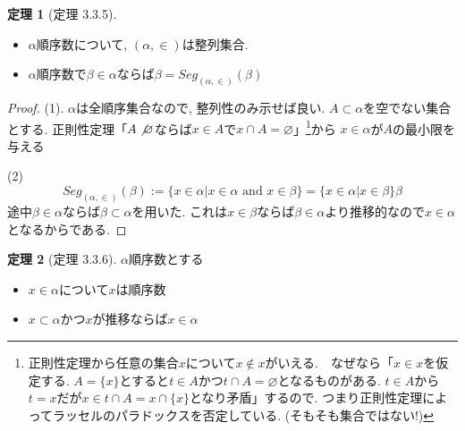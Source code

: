 \documentclass[dvipdfmx,a4paper,11pt]{report}
\theoremstyle{definition}
\newtheorem{thm}{定理}
\begin{document}
 \begin{tcolorbox}
 [colback = white, colframe = green!35!black, fonttitle = \bfseries,breakable = true]
\begin{thm}[定理 3.3.5]
\begin{itemize}
\item $\alpha$順序数について, $(\alpha, \in )$は整列集合.
\item $\alpha$順序数で$\beta \in \alpha$ならば$\beta = Seg_{(\alpha,\in )} (\beta)$
\end{itemize}
\end{thm}
\end{tcolorbox}

\begin{proof}
(1). $\alpha$は全順序集合なので, 整列性のみ示せば良い.
$A \subset \alpha$を空でない集合とする.
正則性定理「$A \not \varnothing$ならば$x \in A $で$x \cap A = \varnothing$」\footnote{正則性定理から任意の集合$x$について$x \not \in x$がいえる.　なぜなら「$x \in x$を仮定する. $A = \{x\}$とすると$t \in A$かつ$t \cap A=\varnothing$となるものがある. $t \in A$から$t=x$だが$x \in t \cap A=x \cap \{ x\} $となり矛盾」するので. つまり正則性定理によってラッセルのパラドックスを否定している. (そもそも集合ではない!)}から
$x \in \alpha$が$A$の最小限を与える

(2)
$$
 Seg_{(\alpha,\in )} (\beta)
 := \{ x \in \alpha | x \in \alpha \text{ and } x \in \beta\}
 =\{ x \in \alpha | x \in \beta\}
 \beta
$$
途中$\beta \in \alpha$ならば$\beta \subset \alpha$を用いた.
これは$x \in \beta$ならば$\beta \in \alpha$より推移的なので$x \in \alpha$となるからである.
\end{proof}

 \begin{tcolorbox}
 [colback = white, colframe = green!35!black, fonttitle = \bfseries,breakable = true]
\begin{thm}[定理 3.3.6]
\label{thm-tanaka-3.3.6}
$\alpha$順序数とする
\begin{itemize}
\item $x \in \alpha $について$x$は順序数
\item $x \subset \alpha$かつ$x$が推移ならば$x \in \alpha$
\end{itemize}
\end{thm}
\end{tcolorbox}
\end{document}
